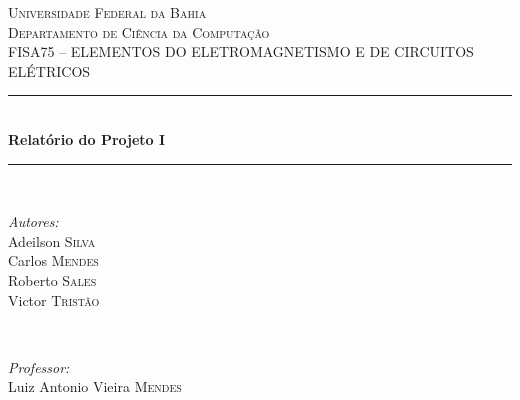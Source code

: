 \begin{titlepage}

\newcommand{\HRule}{\rule{\linewidth}{0.5mm}} %

\center %

  
  \textsc{\LARGE Universidade Federal da Bahia}\\[1.5cm] %
\textsc{\Large Departamento de Ciẽncia da Computação}\\[0.5cm] %
\textsc{\large FISA75 – ELEMENTOS DO ELETROMAGNETISMO E DE CIRCUITOS
ELÉTRICOS}\\[0.5cm] %

  
  \HRule \\[0.4cm]
{ \huge \bfseries Relatório do Projeto I}\\[0.4cm] %
\HRule \\[1.5cm]

  
  \begin{minipage}{0.4\textwidth}
\begin{flushleft} \large
\emph{Autores:}\\
Adeilson \textsc{Silva}\\ %
Carlos \textsc{Mendes}\\ %
Roberto \textsc{Sales}\\ %
Victor \textsc{Tristão}\\ %

\end{flushleft}
\end{minipage}
~
  \begin{minipage}{0.4\textwidth}
\begin{flushright} \large
\emph{Professor:} \\
Luiz Antonio Vieira \textsc{Mendes} %
\end{flushright}
\end{minipage}\\[2cm]


\end{titlepage}
